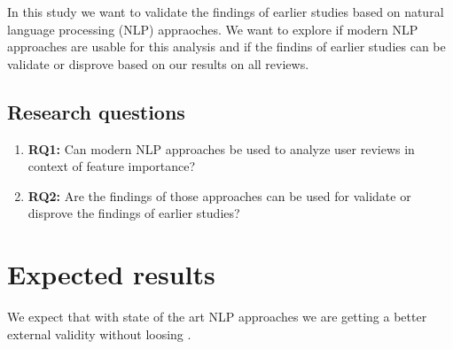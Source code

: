 In this study we want to validate the findings of earlier studies based on natural language processing (NLP) appraoches.
We want to explore if modern NLP approaches are usable for this analysis and
if the findins of earlier studies can be validate or disprove based on our results on all reviews.
\subsection{Research questions}
\label{sec:research-questions}
\begin{enumerate}
\item \textbf{RQ1:} Can modern NLP approaches be used to analyze user reviews in context of feature importance?
\item \textbf{RQ2:} Are the findings of those approaches can be used for validate or disprove the findings of earlier studies?
\end{enumerate}


\section{Expected results}
\label{sec:expected-results}

We expect that with state of the art NLP approaches we are getting a better external validity without loosing .




